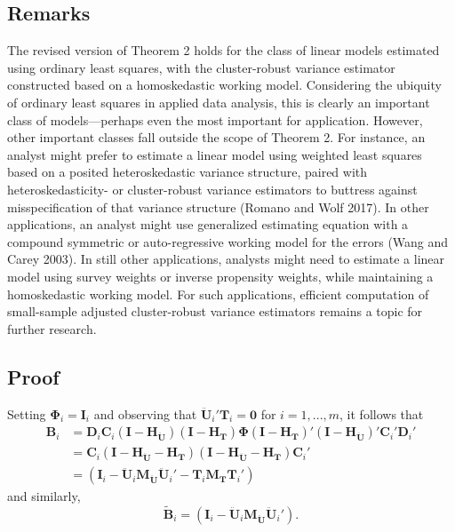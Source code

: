 \documentclass[12pt]{article}
\begin{document}
\hypertarget{remarks}{%
\subsection{Remarks}\label{remarks}}

The revised version of Theorem 2 holds for the class of linear models
estimated using ordinary least squares, with the cluster-robust variance
estimator constructed based on a homoskedastic working model.
Considering the ubiquity of ordinary least squares in applied data
analysis, this is clearly an important class of models---perhaps even
the most important for application. However, other important classes
fall outside the scope of Theorem 2. For instance, an analyst might
prefer to estimate a linear model using weighted least squares based on
a posited heteroskedastic variance structure, paired with
heteroskedasticity- or cluster-robust variance estimators to buttress
against misspecification of that variance structure (Romano and Wolf
2017). In other applications, an analyst might use generalized
estimating equation with a compound symmetric or auto-regressive working
model for the errors (Wang and Carey 2003). In still other applications,
analysts might need to estimate a linear model using survey weights or
inverse propensity weights, while maintaining a homoskedastic working
model. For such applications, efficient computation of small-sample
adjusted cluster-robust variance estimators remains a topic for further
research.

\hypertarget{proof}{%
\subsection{Proof}\label{proof}}

Setting \(\boldsymbol\Phi_i = \mathbf{I}_i\) and observing that
\(\mathbf{\ddot{U}}_i'\mathbf{T}_i = \mathbf{0}\) for \(i = 1,...,m\),
it follows that \begin{align}
\mathbf{B}_i &= \mathbf{D}_i \mathbf{C}_i \left(\mathbf{I} - \mathbf{H_{\ddot{U}}}\right) \left(\mathbf{I} - \mathbf{H_T}\right) \boldsymbol\Phi \left(\mathbf{I} - \mathbf{H_T}\right)' \left(\mathbf{I} - \mathbf{H_{\ddot{U}}}\right)' \mathbf{C}_i' \mathbf{D}_i' \nonumber \\ 
&= \mathbf{C}_i \left(\mathbf{I} - \mathbf{H_{\ddot{U}}} - \mathbf{H_T}\right) \left(\mathbf{I} - \mathbf{H_{\ddot{U}}} - \mathbf{H_T}\right) \mathbf{C}_i' \nonumber\\ 
\label{eq:B_i}
&= \left(\mathbf{I}_i - \mathbf{\ddot{U}}_i \mathbf{M_{\ddot{U}}}\mathbf{\ddot{U}}_i' - \mathbf{T}_i \mathbf{M_T}\mathbf{T}_i'\right)
\end{align} and similarly, \begin{equation}
\label{eq:Btilde_i}
\tilde{\mathbf{B}}_i = \left(\mathbf{I}_i - \mathbf{\ddot{U}}_i \mathbf{M_{\ddot{U}}}\mathbf{\ddot{U}}_i'\right).
\end{equation}
\end{document}
